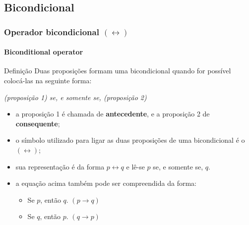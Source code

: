 \subsection{Bicondicional}
%
\begin{frame}[t]
    \frametitle{Operador bicondicional $(\leftrightarrow)$ }
    \framesubtitle{Biconditional operator}
    \begin{block}{Definição}
        Duas proposições formam uma bicondicional quando for possível colocá-las na seguinte forma: \\[2pt]
        \begin{center}
            \textit{(proposição 1) se, e somente se, (proposição 2)}
        \end{center}
        \begin{itemize}
            \item a proposição 1 é chamada de \textbf{antecedente}, e a proposição 2 de \textbf{consequente};
            \item o símbolo utilizado para ligar as duas proposições de uma bicondicional é o $(\leftrightarrow)$;
            \item sua representação é da forma $p \leftrightarrow q$ e lê-se $p$ se, e somente se, $q$.
            \item a equação acima também pode ser compreendida da forma:
            \begin{itemize}
                \item[\ding{114}] Se $p$, então $q$. $(p \rightarrow q)$
                \item[\ding{114}] Se $q$, então $p$. $(q \rightarrow p)$
            \end{itemize}
        \end{itemize}
    \end{block}
\end{frame}
%
